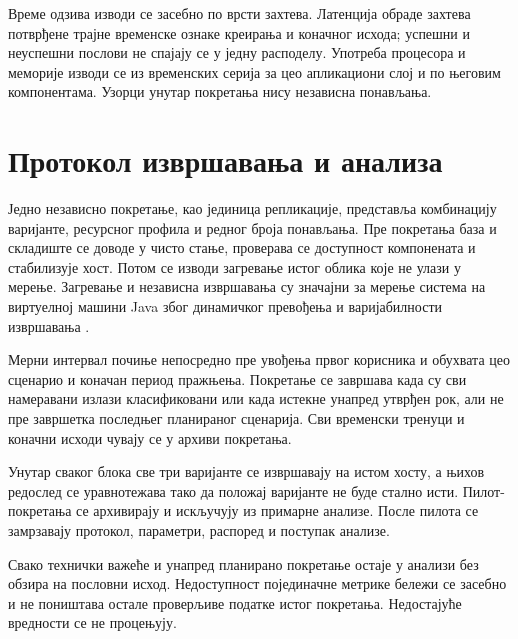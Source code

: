 \documentclass[12pt,oneside]{memoir}
\begin{document}
Време одзива изводи се засебно по врсти захтева. Латенција обраде захтева
потврђене трајне временске ознаке креирања и коначног исхода; успешни и
неуспешни послови не спајају се у једну расподелу. Употреба процесора и
меморије изводи се из временских серија за цео апликациони слој и по његовим
компонентама. Узорци унутар покретања нису независна понављања.


\section{Протокол извршавања и анализа}

Једно независно покретање, као јединица репликације, представља комбинацију
варијанте, ресурсног профила и редног броја понављања. Пре покретања база и
складиште се доводе у чисто стање, проверава се доступност компонената и
стабилизује хост. Потом се изводи загревање истог облика које не улази у
мерење. Загревање и независна извршавања су значајни за мерење система на
виртуелној машини {\lat Java} због динамичког превођења и варијабилности
извршавања \cite{georges2007statistically}.

Мерни интервал почиње непосредно пре увођења првог корисника и обухвата цео
сценарио и коначан период пражњења. Покретање се завршава када су сви
намеравани излази класификовани или када истекне унапред утврђен рок, али не
пре завршетка последњег планираног сценарија. Сви временски тренуци и коначни
исходи чувају се у архиви покретања.


Унутар сваког блока све три варијанте се извршавају на истом хосту, а њихов
редослед се уравнотежава тако да положај варијанте не буде стално исти.
Пилот-покретања се архивирају и искључују из примарне анализе. После пилота се
замрзавају протокол, параметри, распоред и поступак анализе.

Свако технички важеће и унапред планирано покретање остаје у анализи без
обзира на пословни исход. Недоступност појединачне метрике бележи се засебно и
не поништава остале проверљиве податке истог покретања. Недостајуће вредности
се не процењују.
\end{document}
